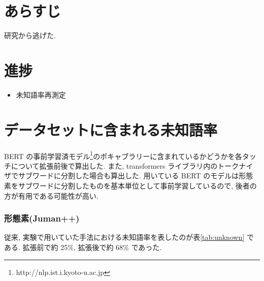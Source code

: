 \documentclass[twocolumn]{jarticle}     %
\begin{document}

\section{あらすじ}
研究から逃げた.

\section{進捗}

\begin{itemize}
  \item 未知語率再測定
\end{itemize}

\section{データセットに含まれる未知語率}

BERT の事前学習済モデル\footnote{http://nlp.ist.i.kyoto-u.ac.jp}のボキャブラリーに含まれているかどうかを各タッチについて拡張前後で算出した. また, transformers ライブラリ内のトークナイザでサブワードに分割した場合も算出した. 用いている BERT のモデルは形態素をサブワードに分割したものを基本単位として事前学習しているので, 後者の方が有用である可能性が高い.

\subsubsection{形態素(Juman++)}
従来, 実験で用いていた手法における未知語率を表したのが表\ref{tab:unknown} である.
拡張前で約 25\%, 拡張後で約 68\% であった.

\begin{table}[htb]
\begin{center}
\caption{データセットに含まれる未知語率}
\end{center}
\end{table}
\end{document}
